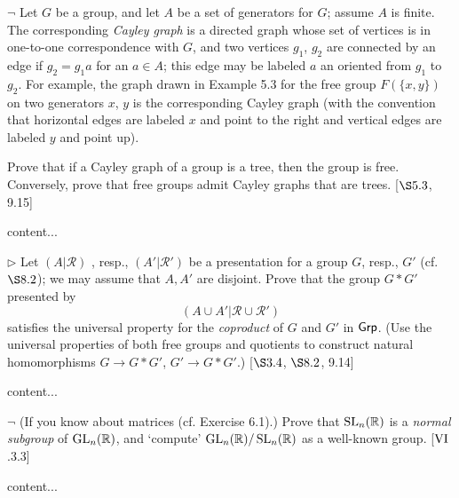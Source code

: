 \begin{exercise}
	$\neg$ Let $G$ be a group, and let $A$ be a set of generators for $G$; assume $A$ is finite. The corresponding \emph{Cayley graph} is a directed graph whose set of vertices is in one-to-one correspondence with $G$, and two vertices $g_1$, $g_2$ are connected by an edge if $g_2 = g_1 a$ for an $a\in A$; this edge may be labeled $a$ an oriented from $g_1$ to $g_2$. For example, the graph drawn in Example 5.3 for the free group $F(\{x,y\})$ on two generators $x$, $y$ is the corresponding Cayley graph (with the convention that horizontal edges are labeled $x$ and point to the right and vertical edges are labeled $y$ and point up).
	
	Prove that if a Cayley graph of a group is a tree, then the group is free. Conversely, prove that free groups admit Cayley graphs that are trees. [$\S 5.3$, 9.15]
\end{exercise}
\begin{solution}
	content...
\end{solution}

\begin{exercise}
	$\triangleright$ Let $(A|\mathscr{R})$ , resp., $(A'|\mathscr{R}')$ be a presentation for a group $G$, resp., $G'$ (cf. $\S 8.2$); we may assume that $A, A'$ are disjoint. Prove that the group $G \ast G'$ presented by
	\[
		(A \cup A'|\mathscr{R} \cup \mathscr{R}')
	\]
	satisfies the universal property for the \emph{coproduct} of $G$ and $G'$ in $\textsf{Grp}$. (Use the universal properties of both free groups and quotients to construct natural homomorphisms $G \to G\ast G'$, $G'\to G \ast G'$.) [$\S 3.4$, $\S 8.2$, 9.14]
\end{exercise}
\begin{solution}
	content...
\end{solution}

\begin{exercise}
	$\neg$ (If you know about matrices (cf. Exercise 6.1).) Prove that $\operatorname{SL}_n(\mathbb{R})$ is a \emph{normal subgroup} of $\operatorname{GL}_n(\mathbb{R})$, and `compute' $\operatorname{GL}_n(\mathbb{R})/\operatorname{SL}_n(\mathbb{R})$ as a well-known group. [$\RNo{6}$.3.3]
\end{exercise}
\begin{solution}
	content...
\end{solution}

